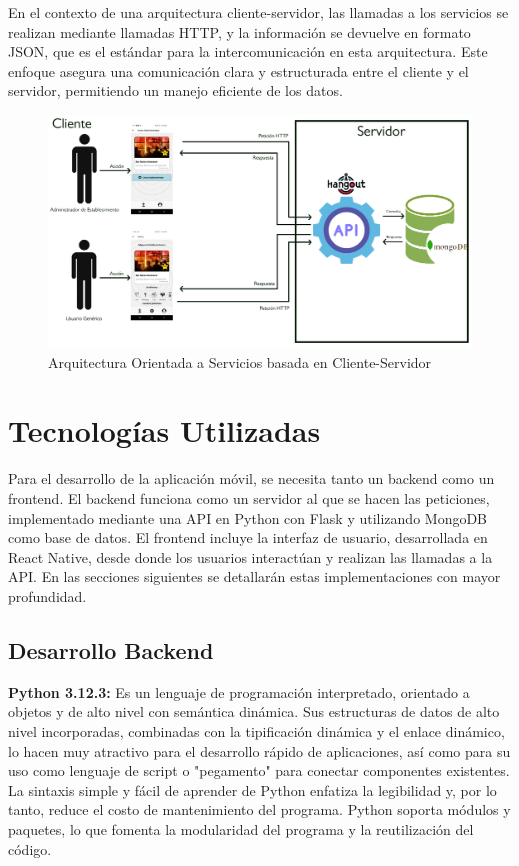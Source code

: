 En el contexto de una arquitectura cliente-servidor, las llamadas a los servicios se realizan mediante llamadas HTTP, y la información se devuelve en formato JSON, que es el estándar para la intercomunicación en esta arquitectura. Este enfoque asegura una comunicación clara y estructurada entre el cliente y el servidor, permitiendo un manejo eficiente de los datos.

\begin{figure}[H]
    \centering
    \includegraphics[width=\textwidth]{imagenes/ARQUITECTURA.jpg}
    \caption{Arquitectura Orientada a Servicios basada en Cliente-Servidor}
    \label{fig:ARQUITECTURA}
\end{figure}


\section{Tecnologías Utilizadas}

Para el desarrollo de la aplicación móvil, se necesita tanto un backend como un frontend. El backend funciona como un servidor al que se hacen las peticiones, implementado mediante una API en Python con Flask y utilizando MongoDB como base de datos. El frontend incluye la interfaz de usuario, desarrollada en React Native, desde donde los usuarios interactúan y realizan las llamadas a la API. En las secciones siguientes se detallarán estas implementaciones con mayor profundidad.

\subsection{Desarrollo Backend}

\textbf{Python 3.12.3:} Es un lenguaje de programación interpretado, orientado a objetos y de alto nivel con semántica dinámica. Sus estructuras de datos de alto nivel incorporadas, combinadas con la tipificación dinámica y el enlace dinámico, lo hacen muy atractivo para el desarrollo rápido de aplicaciones, así como para su uso como lenguaje de script o "pegamento" para conectar componentes existentes. La sintaxis simple y fácil de aprender de Python enfatiza la legibilidad y, por lo tanto, reduce el costo de mantenimiento del programa. Python soporta módulos y paquetes, lo que fomenta la modularidad del programa y la reutilización del código. \cite{python_faq}

